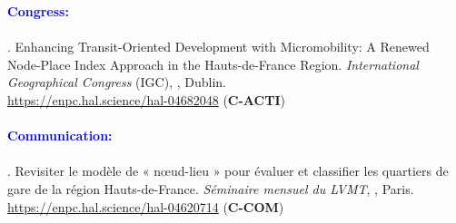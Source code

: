 \begin{refsegment}
     \newpage
     
    \begin{tcolorbox}[colback=white!5!white,
                      colframe=blue!75!blue,
                      title=Valorization
                      \\
                      Chapter~6]
\Large{\textcolor{blue}{\textbf{Congress:}}}
    \\\\
\small{\textcolor{blue}{\textcite{moinse_enhancing_2024}}. Enhancing Transit-Oriented Development with Micromobility: A Renewed Node-Place Index Approach in the Hauts-de-France Region. \textsl{International Geographical Congress} (IGC), \textsl{}, Dublin.
\\
\footnotesize{\url{https://enpc.hal.science/hal-04682048}} (\textbf{C-ACTI})}
    \\\\
\Large{\textcolor{blue}{\textbf{Communication:}}}
    \\\\
\small{\textcolor{blue}{\textcite{moinse_revisiter_2024}}. Revisiter le modèle de « nœud-lieu » pour évaluer et classifier les quartiers de gare de la région Hauts-de-France. \textsl{Séminaire mensuel du LVMT}, , Paris.
\\
\footnotesize{\url{https://enpc.hal.science/hal-04620714}} (\textbf{C-COM})}
    \end{tcolorbox}

    \newpage
    \begingroup
    \renewcommand{\bibfont}{\scriptsize}
\printbibliography[segment=\therefsegment, heading=subbibintoc, title={Bibliography of Chapter~6}, label=chap6:bibliographie]
    \endgroup
    \end{refsegment}